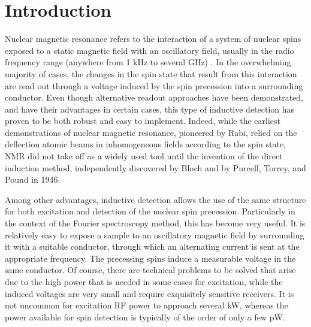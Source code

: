 

\section{Introduction}

Nuclear magnetic resonance refers to the interaction of a system of nuclear spins exposed to a static 
magnetic field with an oscillatory field, usually in the radio frequency range (anywhere from 1 kHz to 
several GHz) \cite{Abragam:1961vg}. In the overwhelming majority of cases, the changes in the spin state that 
result from this interaction are read out through a voltage induced by the spin precession into a 
surrounding conductor. Even though alternative readout approaches have been demonstrated, and have 
their advantages in certain cases, this type of inductive detection has proven to be both robust and 
easy to implement. Indeed, while the earliest demonstrations of nuclear magnetic resonance, pioneered 
by Rabi,\cite{Rabi:1938tq} relied on the deflection atomic beams in inhomogeneous fields according to 
the spin state, NMR did not take off as a widely used tool until the invention of the direct induction 
method, independently discovered by Bloch\cite{Bloch:1946hk} and by Purcell, Torrey, and Pound\cite{Purcell:1946ft} in 1946. 

Among other advantages, inductive detection allows the use of the same structure for both excitation and detection of 
the nuclear spin precession. Particularly in the context of the Fourier spectroscopy method,\cite{Ernst:1966cr} this has 
become very useful. It is relatively easy to expose a sample to an oscillatory magnetic field by 
surrounding it with a suitable conductor, through which an alternating current is sent at the appropriate 
frequency. The precessing spins induce a measurable voltage in the same conductor. Of course, there are 
technical problems to be solved that arise due to the high power that is needed in some cases for 
excitation, while the induced voltages are very small and require exquisitely sensitive receivers. It 
is not uncommon for excitation RF power to approach several kW, whereas the power available for spin 
detection is typically of the order of only a few pW.

